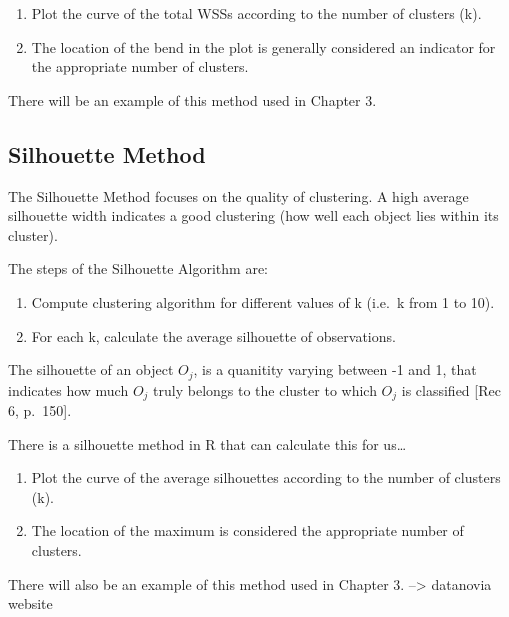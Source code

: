 \documentclass[12pt,twoside]{amherstthesis}
\providecommand{\tightlist}{%
  \setlength{\itemsep}{0pt}\setlength{\parskip}{0pt}}
\begin{document}
  \begin{enumerate}
  \def\labelenumi{\arabic{enumi}.}
  \setcounter{enumi}{2}
  \tightlist
  \item
    Plot the curve of the total WSSs according to the number of clusters
    (k).
  \item
    The location of the bend in the plot is generally considered an
    indicator for the appropriate number of clusters.
  \end{enumerate}
  
  There will be an example of this method used in Chapter 3.
  
  \subsection{Silhouette Method}\label{silhouette-method}
  
  The Silhouette Method focuses on the quality of clustering. A high
  average silhouette width indicates a good clustering (how well each
  object lies within its cluster).
  
  The steps of the Silhouette Algorithm are:
  
  \begin{enumerate}
  \def\labelenumi{\arabic{enumi}.}
  \tightlist
  \item
    Compute clustering algorithm for different values of k (i.e.~k from 1
    to 10).
  \item
    For each k, calculate the average silhouette of observations.
  \end{enumerate}
  
  The silhouette of an object \(O_j\), is a quanitity varying between -1
  and 1, that indicates how much \(O_j\) truly belongs to the cluster to
  which \(O_j\) is classified {[}Rec 6, p.~150{]}.
  
  There is a silhouette method in R that can calculate this for us\ldots{}
  
  \begin{enumerate}
  \def\labelenumi{\arabic{enumi}.}
  \setcounter{enumi}{2}
  \tightlist
  \item
    Plot the curve of the average silhouettes according to the number of
    clusters (k).
  \item
    The location of the maximum is considered the appropriate number of
    clusters.
  \end{enumerate}
  
  There will also be an example of this method used in Chapter 3.
  --\textgreater{} datanovia website
  
\end{document}
